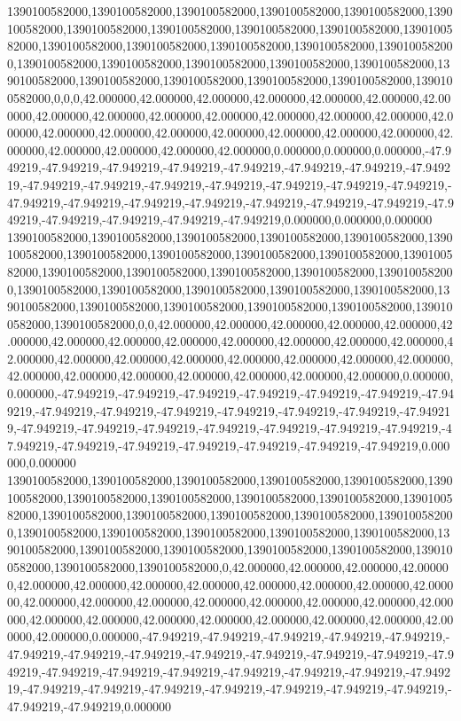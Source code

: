 1390100582000,1390100582000,1390100582000,1390100582000,1390100582000,1390100582000,1390100582000,1390100582000,1390100582000,1390100582000,1390100582000,1390100582000,1390100582000,1390100582000,1390100582000,1390100582000,1390100582000,1390100582000,1390100582000,1390100582000,1390100582000,1390100582000,1390100582000,1390100582000,1390100582000,1390100582000,1390100582000,0,0,0,42.000000,42.000000,42.000000,42.000000,42.000000,42.000000,42.000000,42.000000,42.000000,42.000000,42.000000,42.000000,42.000000,42.000000,42.000000,42.000000,42.000000,42.000000,42.000000,42.000000,42.000000,42.000000,42.000000,42.000000,42.000000,42.000000,42.000000,0.000000,0.000000,0.000000,-47.949219,-47.949219,-47.949219,-47.949219,-47.949219,-47.949219,-47.949219,-47.949219,-47.949219,-47.949219,-47.949219,-47.949219,-47.949219,-47.949219,-47.949219,-47.949219,-47.949219,-47.949219,-47.949219,-47.949219,-47.949219,-47.949219,-47.949219,-47.949219,-47.949219,-47.949219,-47.949219,0.000000,0.000000,0.000000
1390100582000,1390100582000,1390100582000,1390100582000,1390100582000,1390100582000,1390100582000,1390100582000,1390100582000,1390100582000,1390100582000,1390100582000,1390100582000,1390100582000,1390100582000,1390100582000,1390100582000,1390100582000,1390100582000,1390100582000,1390100582000,1390100582000,1390100582000,1390100582000,1390100582000,1390100582000,1390100582000,1390100582000,0,0,42.000000,42.000000,42.000000,42.000000,42.000000,42.000000,42.000000,42.000000,42.000000,42.000000,42.000000,42.000000,42.000000,42.000000,42.000000,42.000000,42.000000,42.000000,42.000000,42.000000,42.000000,42.000000,42.000000,42.000000,42.000000,42.000000,42.000000,42.000000,0.000000,0.000000,-47.949219,-47.949219,-47.949219,-47.949219,-47.949219,-47.949219,-47.949219,-47.949219,-47.949219,-47.949219,-47.949219,-47.949219,-47.949219,-47.949219,-47.949219,-47.949219,-47.949219,-47.949219,-47.949219,-47.949219,-47.949219,-47.949219,-47.949219,-47.949219,-47.949219,-47.949219,-47.949219,-47.949219,0.000000,0.000000
1390100582000,1390100582000,1390100582000,1390100582000,1390100582000,1390100582000,1390100582000,1390100582000,1390100582000,1390100582000,1390100582000,1390100582000,1390100582000,1390100582000,1390100582000,1390100582000,1390100582000,1390100582000,1390100582000,1390100582000,1390100582000,1390100582000,1390100582000,1390100582000,1390100582000,1390100582000,1390100582000,1390100582000,1390100582000,0,42.000000,42.000000,42.000000,42.000000,42.000000,42.000000,42.000000,42.000000,42.000000,42.000000,42.000000,42.000000,42.000000,42.000000,42.000000,42.000000,42.000000,42.000000,42.000000,42.000000,42.000000,42.000000,42.000000,42.000000,42.000000,42.000000,42.000000,42.000000,42.000000,0.000000,-47.949219,-47.949219,-47.949219,-47.949219,-47.949219,-47.949219,-47.949219,-47.949219,-47.949219,-47.949219,-47.949219,-47.949219,-47.949219,-47.949219,-47.949219,-47.949219,-47.949219,-47.949219,-47.949219,-47.949219,-47.949219,-47.949219,-47.949219,-47.949219,-47.949219,-47.949219,-47.949219,-47.949219,-47.949219,0.000000
